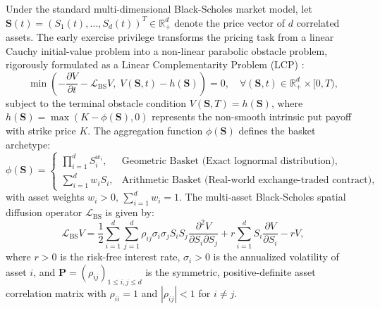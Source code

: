 \documentclass[11pt,a4paper]{article}
\begin{document}
Under the standard multi-dimensional Black-Scholes market model, let $\mathbf{S}(t) = (S_1(t), \dots, S_d(t))^T \in \mathbb{R}_+^d$ denote the price vector of $d$ correlated assets. The early exercise privilege transforms the pricing task from a linear Cauchy initial-value problem into a non-linear parabolic obstacle problem, rigorously formulated as a Linear Complementarity Problem (LCP) \cite{cryer1971solution, jaillet1990variational, forsyth2002quadratic, ikonen2007componentwise}:
\begin{equation}
\label{eq:lcp_intro}
\min\left( -\frac{\partial V}{\partial t} - \mathcal{L}_{\text{BS}} V, \; V(\mathbf{S}, t) - h(\mathbf{S}) \right) = 0, \quad \forall (\mathbf{S}, t) \in \mathbb{R}_+^d \times [0, T),
\end{equation}
subject to the terminal obstacle condition $V(\mathbf{S}, T) = h(\mathbf{S})$, where $h(\mathbf{S}) = \max\left(K - \phi(\mathbf{S}), 0\right)$ represents the non-smooth intrinsic put payoff with strike price $K$. The aggregation function $\phi(\mathbf{S})$ defines the basket archetype:
\begin{equation}
\label{eq:basket_types}
\phi(\mathbf{S}) = 
\begin{cases}
\prod_{i=1}^d S_i^{w_i}, & \text{Geometric Basket (Exact lognormal distribution)}, \\
\sum_{i=1}^d w_i S_i, & \text{Arithmetic Basket (Real-world exchange-traded contract)},
\end{cases}
\end{equation}
with asset weights $w_i > 0, \, \sum_{i=1}^d w_i = 1$. The multi-asset Black-Scholes spatial diffusion operator $\mathcal{L}_{\text{BS}}$ is given by:
\begin{equation}
\label{eq:bs_operator_intro}
\mathcal{L}_{\text{BS}} V = \frac{1}{2} \sum_{i=1}^d \sum_{j=1}^d \rho_{ij} \sigma_i \sigma_j S_i S_j \frac{\partial^2 V}{\partial S_i \partial S_j} + r \sum_{i=1}^d S_i \frac{\partial V}{\partial S_i} - r V,
\end{equation}
where $r > 0$ is the risk-free interest rate, $\sigma_i > 0$ is the annualized volatility of asset $i$, and $\mathbf{P} = (\rho_{ij})_{1 \le i, j \le d}$ is the symmetric, positive-definite asset correlation matrix with $\rho_{ii} = 1$ and $|\rho_{ij}| < 1$ for $i \neq j$.
\end{document}
